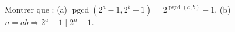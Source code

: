 Montrer que : (a) $\operatorname{pgcd}(2^a - 1, 2^b - 1) = 2^{\operatorname{pgcd}(a,b)} - 1$. (b) $n = ab \Rightarrow 2^a - 1 \mid 2^n - 1$.
